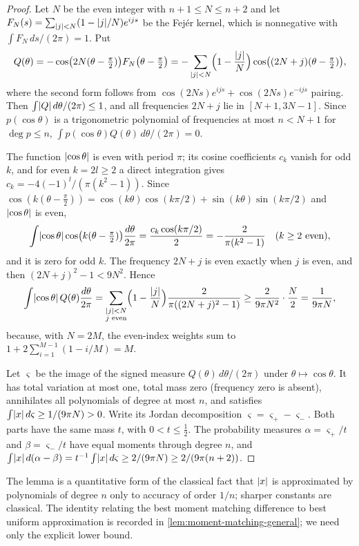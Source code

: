 \begin{proof}
Let $N$ be the even integer with $n+1\le N\le n+2$ and let
$F_N(s)=\sum_{\lvert j\rvert<N}(1-\lvert j\rvert/N)e^{ijs}$ be the Fejér kernel, which is
nonnegative with $\int F_N\,ds/(2\pi)=1$. Put
\[
  Q(\theta)=-\cos\bigl(2N(\theta-\tfrac\pi2)\bigr)F_N\bigl(\theta-\tfrac\pi2\bigr)
  =-\sum_{\lvert j\rvert<N}\Bigl(1-\frac{\lvert j\rvert}N\Bigr)\cos\bigl((2N+j)(\theta-\tfrac\pi2)\bigr),
\]
where the second form follows from $\cos(2Ns)e^{ijs}+\cos(2Ns)e^{-ijs}$
pairing. Then $\int\lvert Q\rvert\,d\theta/(2\pi)\le1$, and all frequencies $2N+j$
lie in $[N+1,3N-1]$. Since $p(\cos\theta)$ is a trigonometric polynomial of
frequencies at most $n<N+1$ for $\deg p\le n$, $\int p(\cos\theta)Q(\theta)\,
d\theta/(2\pi)=0$.

The function $\lvert \cos\theta\rvert$ is even with period $\pi$; its cosine
coefficients $c_k$ vanish for odd $k$, and for even $k=2l\ge2$ a direct
integration gives $c_k=-4(-1)^l/(\pi(k^2-1))$. Since
$\cos(k(\theta-\tfrac\pi2))=\cos(k\theta)\cos(k\pi/2)+\sin(k\theta)\sin(k\pi/2)$
and $\lvert \cos\theta\rvert$ is even,
\[
  \int\lvert \cos\theta\rvert\cos\bigl(k(\theta-\tfrac\pi2)\bigr)\frac{d\theta}{2\pi}
  =\frac{c_k\cos(k\pi/2)}2=-\frac2{\pi(k^2-1)}\quad(k\ge2\text{ even}),
\]
and it is zero for odd $k$. The frequency $2N+j$ is even exactly when $j$
is even, and then $(2N+j)^2-1<9N^2$. Hence
\[
  \int\lvert \cos\theta\rvert\,Q(\theta)\frac{d\theta}{2\pi}
  =\sum_{\substack{\lvert j\rvert<N\\ j\text{ even}}}\Bigl(1-\frac{\lvert j\rvert}N\Bigr)
  \frac2{\pi((2N+j)^2-1)}
  \ge\frac2{9\pi N^2}\cdot\frac N2=\frac1{9\pi N},
\]
because, with $N=2M$, the even-index weights sum to
$1+2\sum_{i=1}^{M-1}(1-i/M)=M$.

Let $\varsigma$ be the image of the signed measure $Q(\theta)\,d\theta/(2\pi)$
under $\theta\mapsto\cos\theta$. It has total variation at most one, total
mass zero (frequency zero is absent), annihilates all polynomials of degree
at most $n$, and satisfies $\int\lvert x\rvert\,d\varsigma\ge1/(9\pi N)>0$. Write its
Jordan decomposition $\varsigma=\varsigma_+-\varsigma_-$. Both parts have the
same mass $t$, with $0<t\le\frac12$. The probability measures
$\alpha=\varsigma_+/t$ and $\beta=\varsigma_-/t$ have equal moments through
degree $n$, and $\int\lvert x\rvert\,d(\alpha-\beta)=t^{-1}\int\lvert x\rvert\,d\varsigma\ge
2/(9\pi N)\ge2/(9\pi(n+2))$.
\end{proof}

The lemma is a quantitative form of the classical fact that $\lvert x\rvert$ is
approximated by polynomials of degree $n$ only to accuracy of order $1/n$;
sharper constants are classical. The identity relating the best moment
matching difference to best uniform approximation is recorded in
\cref{lem:moment-matching-general}; we need only the explicit lower bound.

